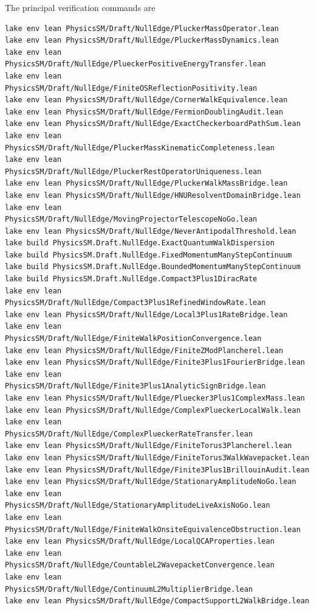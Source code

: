 \documentclass[11pt]{article}
\begin{document}
The principal verification commands are
\begin{verbatim}
lake env lean PhysicsSM/Draft/NullEdge/PluckerMassOperator.lean
lake env lean PhysicsSM/Draft/NullEdge/PluckerMassDynamics.lean
lake env lean PhysicsSM/Draft/NullEdge/PlueckerPositiveEnergyTransfer.lean
lake env lean PhysicsSM/Draft/NullEdge/FiniteOSReflectionPositivity.lean
lake env lean PhysicsSM/Draft/NullEdge/CornerWalkEquivalence.lean
lake env lean PhysicsSM/Draft/NullEdge/FermionDoublingAudit.lean
lake env lean PhysicsSM/Draft/NullEdge/ExactCheckerboardPathSum.lean
lake env lean PhysicsSM/Draft/NullEdge/PluckerMassKinematicCompleteness.lean
lake env lean PhysicsSM/Draft/NullEdge/PluckerRestOperatorUniqueness.lean
lake env lean PhysicsSM/Draft/NullEdge/PluckerWalkMassBridge.lean
lake env lean PhysicsSM/Draft/NullEdge/HNUResolventDomainBridge.lean
lake env lean PhysicsSM/Draft/NullEdge/MovingProjectorTelescopeNoGo.lean
lake env lean PhysicsSM/Draft/NullEdge/NeverAntipodalThreshold.lean
lake build PhysicsSM.Draft.NullEdge.ExactQuantumWalkDispersion
lake build PhysicsSM.Draft.NullEdge.FixedMomentumManyStepContinuum
lake build PhysicsSM.Draft.NullEdge.BoundedMomentumManyStepContinuum
lake build PhysicsSM.Draft.NullEdge.Compact3Plus1DiracRate
lake env lean PhysicsSM/Draft/NullEdge/Compact3Plus1RefinedWindowRate.lean
lake env lean PhysicsSM/Draft/NullEdge/Local3Plus1RateBridge.lean
lake env lean PhysicsSM/Draft/NullEdge/FiniteWalkPositionConvergence.lean
lake env lean PhysicsSM/Draft/NullEdge/FiniteZModPlancherel.lean
lake env lean PhysicsSM/Draft/NullEdge/Finite3Plus1FourierBridge.lean
lake env lean PhysicsSM/Draft/NullEdge/Finite3Plus1AnalyticSignBridge.lean
lake env lean PhysicsSM/Draft/NullEdge/Pluecker3Plus1ComplexMass.lean
lake env lean PhysicsSM/Draft/NullEdge/ComplexPlueckerLocalWalk.lean
lake env lean PhysicsSM/Draft/NullEdge/ComplexPlueckerRateTransfer.lean
lake env lean PhysicsSM/Draft/NullEdge/FiniteTorus3Plancherel.lean
lake env lean PhysicsSM/Draft/NullEdge/FiniteTorus3WalkWavepacket.lean
lake env lean PhysicsSM/Draft/NullEdge/Finite3Plus1BrillouinAudit.lean
lake env lean PhysicsSM/Draft/NullEdge/StationaryAmplitudeNoGo.lean
lake env lean PhysicsSM/Draft/NullEdge/StationaryAmplitudeLiveAxisNoGo.lean
lake env lean PhysicsSM/Draft/NullEdge/FiniteWalkOnsiteEquivalenceObstruction.lean
lake env lean PhysicsSM/Draft/NullEdge/LocalQCAProperties.lean
lake env lean PhysicsSM/Draft/NullEdge/CountableL2WavepacketConvergence.lean
lake env lean PhysicsSM/Draft/NullEdge/ContinuumL2MultiplierBridge.lean
lake env lean PhysicsSM/Draft/NullEdge/CompactSupportL2WalkBridge.lean

\end{verbatim}
\end{document}
